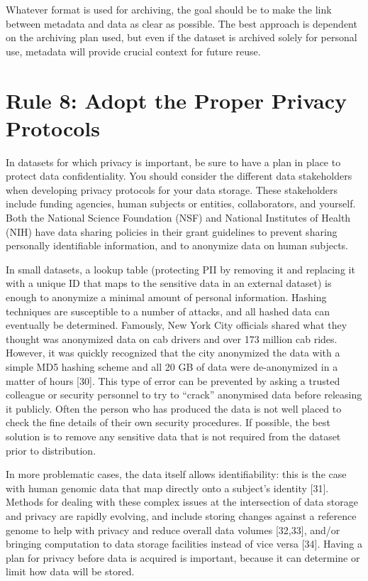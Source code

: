\documentclass[10pt,letterpaper]{article}
\begin{document}
Whatever format is used for archiving, the goal should be to make the
link between metadata and data as clear as possible. The best approach
is dependent on the archiving plan used, but even if the dataset is
archived solely for personal use, metadata will provide crucial context
for future reuse.

\section*{Rule 8: Adopt the Proper Privacy
Protocols}\label{rule-8-adopt-the-proper-privacy-protocols}

In datasets for which privacy is important, be sure to have a plan in
place to protect data confidentiality. You should consider the different
data stakeholders when developing privacy protocols for your data
storage. These stakeholders include funding agencies, human subjects or
entities, collaborators, and yourself. Both the National Science
Foundation (NSF) and National Institutes of Health (NIH) have data
sharing policies in their grant guidelines to prevent sharing personally
identifiable information, and to anonymize data on human subjects.

In small datasets, a lookup table (protecting PII by removing it and
replacing it with a unique ID that maps to the sensitive data in an
external dataset) is enough to anonymize a minimal amount of personal
information. Hashing techniques are susceptible to a number of attacks,
and all hashed data can eventually be determined. Famously, New York
City officials shared what they thought was anonymized data on cab
drivers and over 173 million cab rides. However, it was quickly
recognized that the city anonymized the data with a simple MD5 hashing
scheme and all 20 GB of data were de-anonymized in a matter of hours
{[}30{]}. This type of error can be prevented by asking a trusted
colleague or security personnel to try to ``crack'' anonymised data
before releasing it publicly. Often the person who has produced the data
is not well placed to check the fine details of their own security
procedures. If possible, the best solution is to remove any sensitive
data that is not required from the dataset prior to distribution.

In more problematic cases, the data itself allows identifiability: this
is the case with human genomic data that map directly onto a subject's
identity {[}31{]}. Methods for dealing with these complex issues at the
intersection of data storage and privacy are rapidly evolving, and
include storing changes against a reference genome to help with privacy
and reduce overall data volumes {[}32,33{]}, and/or bringing computation
to data storage facilities instead of vice versa {[}34{]}. Having a plan
for privacy before data is acquired is important, because it can
determine or limit how data will be stored.
\end{document}
